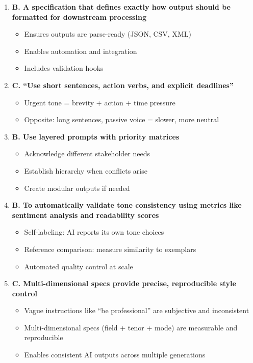\documentclass[11pt]{article}
\begin{document}
\begin{enumerate}
\item \textbf{B. A specification that defines exactly how output should be formatted for downstream processing}
\begin{itemize}
    \item Ensures outputs are parse-ready (JSON, CSV, XML)
    \item Enables automation and integration
    \item Includes validation hooks
\end{itemize}

\item \textbf{C. ``Use short sentences, action verbs, and explicit deadlines''}
\begin{itemize}
    \item Urgent tone = brevity + action + time pressure
    \item Opposite: long sentences, passive voice = slower, more neutral
\end{itemize}

\item \textbf{B. Use layered prompts with priority matrices}
\begin{itemize}
    \item Acknowledge different stakeholder needs
    \item Establish hierarchy when conflicts arise
    \item Create modular outputs if needed
\end{itemize}

\item \textbf{B. To automatically validate tone consistency using metrics like sentiment analysis and readability scores}
\begin{itemize}
    \item Self-labeling: AI reports its own tone choices
    \item Reference comparison: measure similarity to exemplars
    \item Automated quality control at scale
\end{itemize}

\item \textbf{C. Multi-dimensional specs provide precise, reproducible style control}
\begin{itemize}
    \item Vague instructions like ``be professional'' are subjective and inconsistent
    \item Multi-dimensional specs (field + tenor + mode) are measurable and reproducible
    \item Enables consistent AI outputs across multiple generations
\end{itemize}


\end{enumerate}
\end{document}
